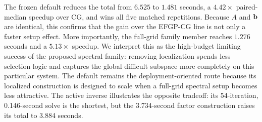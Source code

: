 The frozen default reduces the total from \(6.525\) to \(1.481\) seconds, a
\(4.42\times\) paired-median speedup over CG, and wins all five matched
repetitions.  Because \(A\) and \(\mathbf b\) are identical, this confirms that
the gain over the EFGP-CG line is not only a faster setup effect.  More
importantly, the full-grid family member reaches \(1.276\) seconds and a
\(5.13\times\) speedup.  We interpret this as the high-budget limiting success
of the proposed spectral family: removing localization spends less selection
logic and captures the global difficult subspace more completely on this
particular system.  The default remains the deployment-oriented route because
its localized construction is designed to scale when a full-grid spectral
setup becomes less attractive.  The active inverse illustrates the opposite
tradeoff: its 54-iteration, 0.146-second solve is the shortest, but the
3.734-second factor construction raises its total to 3.884 seconds.

\FloatBarrier

